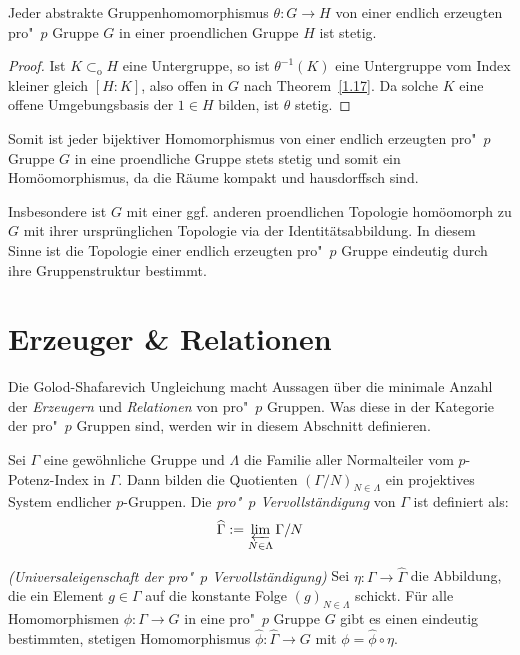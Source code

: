 \documentclass[11pt,a4paper,openany]{memoir}
\begin{document}
\begin{corollary}\label{1.21}
Jeder abstrakte Gruppenhomomorphismus $\theta :G\to H$ von einer endlich erzeugten pro"~$p$ Gruppe $G$ in einer proendlichen Gruppe $H$ ist stetig.
\end{corollary}

\begin{proof}
Ist $K\subset_\text{o} H$ eine Untergruppe, so ist $\theta^{-1}(K)$ eine Untergruppe vom Index kleiner gleich $[H:K]$, also offen in $G$ nach Theorem~\ref{1.17}. Da solche $K$ eine offene Umgebungsbasis der $1\in H$ bilden, ist $\theta$ stetig.
\end{proof}

\begin{remark}
Somit ist jeder bijektiver Homomorphismus von einer endlich erzeugten pro"~$p$ Gruppe $G$ in eine proendliche Gruppe stets stetig und somit ein Homöomorphismus, da die Räume kompakt und hausdorffsch sind. 

Insbesondere ist $G$ mit einer ggf. anderen proendlichen Topologie homöomorph zu $G$ mit ihrer ursprünglichen Topologie via der Identitätsabbildung. In diesem Sinne ist die Topologie einer endlich erzeugten pro"~$p$ Gruppe eindeutig durch ihre Gruppenstruktur bestimmt.
\end{remark}

\section{Erzeuger \& Relationen}

Die Golod-Shafarevich Ungleichung macht Aussagen über die minimale Anzahl der \textit{Erzeugern} und \textit{Relationen} von pro"~$p$ Gruppen. Was diese in der Kategorie der pro"~$p$ Gruppen sind, werden wir in diesem Abschnitt definieren.

\begin{definition}
Sei $\Gamma$ eine gewöhnliche Gruppe und $\Lambda$ die Familie aller Normalteiler vom $p$-Potenz-Index in $\Gamma$. Dann bilden die Quotienten $(\Gamma/N)_{N\in\Lambda}$ ein projektives System endlicher $p$-Gruppen. Die \textit{pro"~$p$ Vervollständigung} von $\Gamma$ ist definiert als:
\[\widehat{\Gamma} :=\varprojlim_{N\in\Lambda} \Gamma/N \]
\end{definition}

\begin{proposition} \textit{(Universaleigenschaft der pro"~$p$ Vervollständigung)}
Sei $\eta : \Gamma\to\widehat{\Gamma}$ die Abbildung, die ein Element $g\in\Gamma$ auf die konstante Folge $(g)_{N\in\Lambda}$ schickt. Für alle Homomorphismen $\phi:\Gamma\to G$ in eine pro"~$p$ Gruppe $G$ gibt es einen eindeutig bestimmten, stetigen Homomorphismus $\widehat{\phi}:\widehat{\Gamma}\to G$ mit $\phi = \widehat{\phi}\circ\eta$.
\end{proposition}
\end{document}
